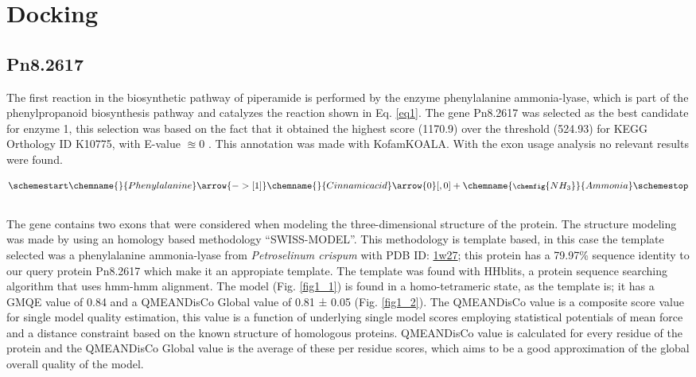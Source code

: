 \documentclass[12pt]{article}
\begin{document}
	
	\section{Docking}
	
	\subsection{Pn8.2617}
	
	The first reaction in the biosynthetic pathway of piperamide is performed by the enzyme phenylalanine ammonia-lyase, which is part of the phenylpropanoid biosynthesis pathway and catalyzes the reaction shown in Eq. \ref{eq1}. The gene Pn8.2617 was selected as the best candidate for enzyme 1, this selection was based on the fact that it obtained the highest score (1170.9) over the threshold (524.93) for KEGG Orthology ID K10775, with E-value $\approxeq 0$ . This annotation was made with KofamKOALA. \cite{kofamkoala} With the exon usage analysis no relevant results were found.
	
	
	\begin{equation}
		\schemestart
		 \label{eq1}
		\chemname{\footnotesize}{Phenylalanine}\arrow{->[\footnotesize 1]}\chemname{\footnotesize}{Cinnamic acid}
		\arrow{0}[,0]+
		\chemname{\footnotesize\chemfig{NH_3}}{Ammonia}
		\schemestop
	\end{equation}\\
	
	The gene contains two exons that were considered when modeling the three-dimensional structure of the protein. The structure modeling was made by using an homology based methodology ``SWISS-MODEL''. \cite{swiss,quaternary_swiss} This methodology is template based, in this case the template selected was a phenylalanine ammonia-lyase from \textit{Petroselinum crispum} with PDB ID: \href{https://www.rcsb.org/structure/1w27}{1w27}; this protein has a 79.97\% sequence identity to our query protein Pn8.2617 which make it an appropiate template. The template was found with HHblits, a protein sequence searching algorithm that uses hmm-hmm alignment. \cite{hhblits} The model (Fig. \ref{fig1_1}) is found in a homo-tetrameric state, as the template is; it has a GMQE value of 0.84 and a QMEANDisCo Global value of 0.81 ± 0.05 (Fig. \ref{fig1_2}). The QMEANDisCo value is a composite score value for single model quality estimation, this value is a function of underlying single model scores employing statistical potentials of mean force and a distance constraint based on the known structure of homologous proteins. QMEANDisCo value is calculated for every residue of the protein and the QMEANDisCo Global value is the average of these per residue scores, which aims to be a good approximation of the global overall quality of the model. \cite{qmeandisco_swiss}
\end{document}
